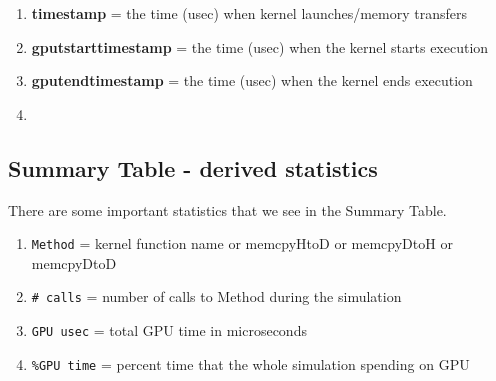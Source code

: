 \begin{enumerate}
\item {\bf timestamp} = the time (usec) when kernel launches/memory
  transfers
\item {\bf gputstarttimestamp} = the time (usec) when the kernel
  starts execution
\item {\bf gputendtimestamp} = the time (usec) when the kernel ends
  execution
\item 
\end{enumerate}

\subsection{Summary Table - derived statistics}
\label{sec:summ-table-deriv}

There are some important statistics that we see in the Summary
Table. 
\begin{enumerate}
\item \verb!Method! = kernel function name or memcpyHtoD or memcpyDtoH or
  memcpyDtoD
\item \verb!# calls! = number of calls to Method during the
  simulation
\item \verb!GPU usec! = total GPU time in microseconds
\item \verb!%GPU time! = percent time that the whole simulation
  spending on GPU
\end{enumerate}

